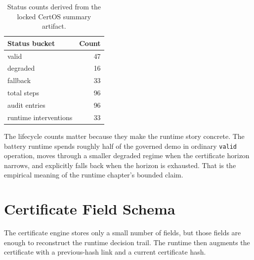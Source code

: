 \begin{table}[ht]
\centering
\caption{Status counts derived from the locked CertOS summary artifact.}
\label{tab:certos-status-counts}
\begin{tabular}{lr}
\toprule
\textbf{Status bucket} & \textbf{Count} \\
\midrule
valid & 47 \\
degraded & 16 \\
fallback & 33 \\
total steps & 96 \\
audit entries & 96 \\
runtime interventions & 33 \\
\bottomrule
\end{tabular}
\end{table}

The lifecycle counts matter because they make the runtime story concrete.
The battery runtime spends roughly half of the governed demo in ordinary
\texttt{valid} operation, moves through a smaller degraded regime when the
certificate horizon narrows, and explicitly falls back when the horizon is
exhausted.  That is the empirical meaning of the runtime chapter's bounded
claim.

\section{Certificate Field Schema}

The certificate engine stores only a small number of fields, but those
fields are enough to reconstruct the runtime decision trail.  The runtime
then augments the certificate with a previous-hash link and a current
certificate hash.

